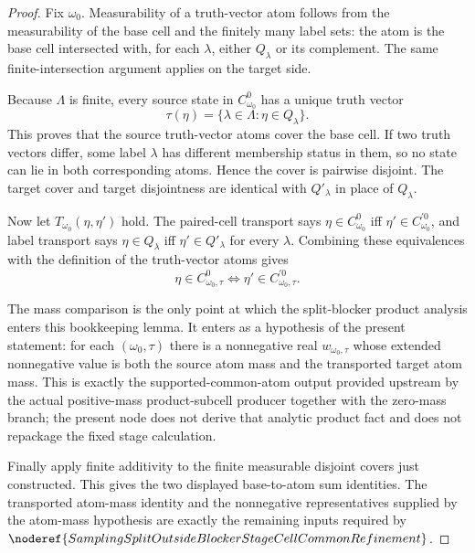 \begin{proof}
Fix \(\omega_0\).  Measurability of a truth-vector atom follows from the
measurability of the base cell and the finitely many label sets: the atom is
the base cell intersected with, for each \(\lambda\), either \(Q_\lambda\) or
its complement.  The same finite-intersection argument applies on the target
side.

Because \(\Lambda\) is finite, every source state in \(C^0_{\omega_0}\) has
a unique truth vector
\[
\tau(\eta)=\{\lambda\in\Lambda:\eta\in Q_\lambda\}.
\]
This proves that the source truth-vector atoms cover the base cell.  If two
truth vectors differ, some label \(\lambda\) has different membership status
in them, so no state can lie in both corresponding atoms.  Hence the cover is
pairwise disjoint.  The target cover and target disjointness are identical
with \(Q'_\lambda\) in place of \(Q_\lambda\).

Now let \(T_{\omega_0}(\eta,\eta')\) hold.  The paired-cell transport says
\(\eta\in C^0_{\omega_0}\) iff
\(\eta'\in C^{\prime0}_{\omega_0}\), and label transport says
\(\eta\in Q_\lambda\) iff \(\eta'\in Q'_\lambda\) for every
\(\lambda\).  Combining these equivalences with the definition of the
truth-vector atoms gives
\[
\eta\in C^0_{\omega_0,\tau}
\Longleftrightarrow
\eta'\in C^{\prime0}_{\omega_0,\tau}.
\]

The mass comparison is the only point at which the split-blocker product
analysis enters this bookkeeping lemma.  It enters as a hypothesis of the
present statement: for each \((\omega_0,\tau)\) there is a nonnegative real
\(w_{\omega_0,\tau}\) whose extended nonnegative value is both the source
atom mass and the transported target atom mass.  This is exactly the
supported-common-atom output provided upstream by the actual positive-mass
product-subcell producer together with the zero-mass branch; the present node
does not derive that analytic product fact and does not repackage the fixed
stage calculation.

Finally apply finite additivity to the finite measurable disjoint covers just
constructed.  This gives the two displayed base-to-atom sum identities.  The
transported atom-mass identity and the nonnegative representatives supplied
by the atom-mass hypothesis are exactly the remaining inputs required by
\(\noderef{SamplingSplitOutsideBlockerStageCellCommonRefinement}\).
\end{proof}
